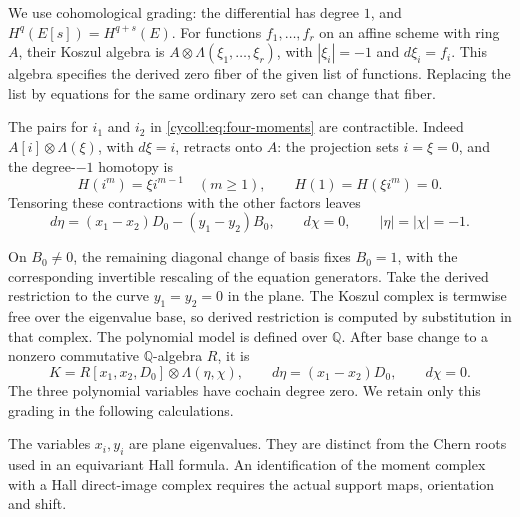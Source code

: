 We use cohomological grading: the differential has degree $1$,
and $H^q(E[s])=H^{q+s}(E)$. For functions $f_1,\ldots,f_r$ on
an affine scheme with ring $A$, their Koszul algebra is
$A\otimes\Lambda(\xi_1,\ldots,\xi_r)$, with
$|\xi_i|=-1$ and $d\xi_i=f_i$. This algebra specifies the derived
zero fiber of the given list of functions. Replacing the list by
equations for the same ordinary zero set can change that fiber.

The pairs for $i_1$ and $i_2$ in
\eqref{cycoll:eq:four-moments} are contractible. Indeed
$A[i]\otimes\Lambda(\xi)$, with $d\xi=i$, retracts onto $A$:
the projection sets $i=\xi=0$, and the degree-$-1$ homotopy is
\[
 H(i^m)=\xi i^{m-1}\quad(m\geq1),\qquad
 H(1)=H(\xi i^m)=0.
\]
Tensoring these contractions with the other factors leaves
\[
 d\eta=(x_1-x_2)D_0-(y_1-y_2)B_0,\qquad d\chi=0,
 \qquad |\eta|=|\chi|=-1.
\]

On $B_0\ne0$, the remaining diagonal change of basis fixes $B_0=1$,
with the corresponding invertible rescaling of the equation generators.
Take the derived restriction to the curve $y_1=y_2=0$ in the plane.
The Koszul complex is termwise free over the eigenvalue base, so
derived restriction is computed by substitution in that complex.
The polynomial model is defined over $\mathbb Q$. After base change
to a nonzero commutative $\mathbb Q$-algebra $R$, it is
\begin{equation}\label{cycoll:eq:moment-complex}
 K=R[x_1,x_2,D_0]\otimes\Lambda(\eta,\chi),\qquad
 d\eta=(x_1-x_2)D_0,\qquad d\chi=0.
\end{equation}
The three polynomial variables have cochain degree zero. We retain
only this grading in
the following calculations.

The variables $x_i,y_i$ are plane eigenvalues. They are distinct
from the Chern roots used in an equivariant Hall formula. An
identification of the moment complex with a Hall direct-image
complex requires the actual support maps, orientation and shift.

